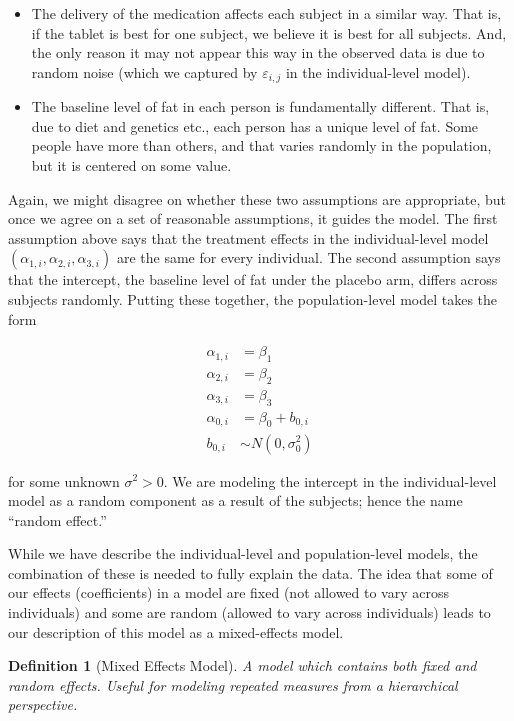 \documentclass[
]{book}
\providecommand{\tightlist}{%
  \setlength{\itemsep}{0pt}\setlength{\parskip}{0pt}}
\theoremstyle{plain}
\theoremstyle{mydefn}
\newtheorem{definition}{Definition}[chapter]
\theoremstyle{myexmpl}
\theoremstyle{remark}
\begin{document}
\begin{itemize}
\tightlist
\item
  The delivery of the medication affects each subject in a similar way. That is, if the tablet is best for one subject, we believe it is best for all subjects. And, the only reason it may not appear this way in the observed data is due to random noise (which we captured by \(\varepsilon_{i,j}\) in the individual-level model).
\item
  The baseline level of fat in each person is fundamentally different. That is, due to diet and genetics etc., each person has a unique level of fat. Some people have more than others, and that varies randomly in the population, but it is centered on some value.
\end{itemize}

Again, we might disagree on whether these two assumptions are appropriate, but once we agree on a set of reasonable assumptions, it guides the model. The first assumption above says that the treatment effects in the individual-level model \(\left(\alpha_{1,i}, \alpha_{2,i}, \alpha_{3,i}\right)\) are the same for every individual. The second assumption says that the intercept, the baseline level of fat under the placebo arm, differs across subjects randomly. Putting these together, the population-level model takes the form

\[
\begin{aligned}
  \alpha_{1,i} &= \beta_1 \\
  \alpha_{2,i} &= \beta_2 \\
  \alpha_{3,i} &= \beta_3 \\
  \alpha_{0,i} &= \beta_0 + b_{0, i} \\
  b_{0,i} &\sim N\left(0, \sigma^2_0\right)
\end{aligned}
\]

for some unknown \(\sigma^2 > 0\). We are modeling the intercept in the individual-level model as a random component as a result of the subjects; hence the name ``random effect.''

While we have describe the individual-level and population-level models, the combination of these is needed to fully explain the data. The idea that some of our effects (coefficients) in a model are fixed (not allowed to vary across individuals) and some are random (allowed to vary across individuals) leads to our description of this model as a mixed-effects model.

\begin{definition}[Mixed Effects Model]
\protect\hypertarget{def:defn-mixed-effects-model}{}{\label{def:defn-mixed-effects-model} {} }A model which contains both fixed and random effects. Useful for modeling repeated measures from a hierarchical perspective.
\end{definition}
\end{document}
